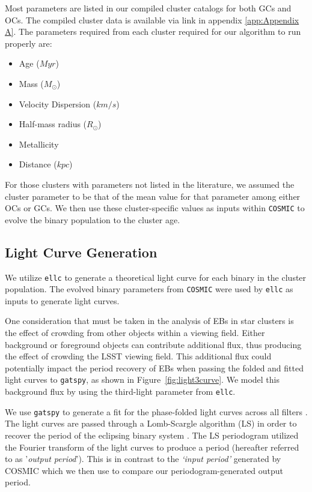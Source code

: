 \documentclass[twocolumn]{aastex63}
\begin{document}
 Most parameters are listed in our compiled cluster catalogs for both GCs and OCs. The compiled cluster data is available via link in appendix \ref{app:Appendix A}. The parameters required from each cluster required for our algorithm to run properly are:
 
\begin{itemize}
    \item Age ($Myr$)
    \item Mass ($M_{\odot}$)
    \item Velocity Dispersion ($km/s$)
    \item Half-mass radius ($R_{\odot}$)
    \item Metallicity
    \item Distance ($kpc$)
\end{itemize}
 For those clusters with parameters  not listed in the literature, we assumed the cluster parameter to be that of the mean value for that parameter among either OCs or GCs. We then use these cluster-specific values as inputs within \texttt{COSMIC} to evolve the binary population to the cluster age.
 
\subsection{Light Curve Generation}
\label{subsec:ellc}
 We utilize \texttt{ellc} \citep{2016ascl.soft03016M} to generate a theoretical light curve for each binary in the cluster population. The evolved binary parameters from \texttt{COSMIC} were used by \texttt{ellc} as inputs to generate light curves.
 
One consideration that must be taken in the analysis of EBs in star clusters is the effect of crowding from other objects within a viewing field. Either background or foreground objects can contribute additional flux, thus producing the effect of crowding the LSST viewing field. This additional flux could potentially impact the period recovery of EBs when passing the folded and fitted light curves to \texttt{gatspy}, as shown in Figure~\ref{fig:light3curve}. We model this background flux by using the third-light parameter from \texttt{ellc}.
 
 We use \texttt{gatspy} to generate a fit for the phase-folded light curves across all filters \citep{2016ascl.soft10007V}. The light curves are passed through a Lomb-Scargle algorithm (LS) in order to recover the period of the eclipsing binary system \citep{2015ApJ...812...18V}. The LS periodogram utilized the Fourier transform of the light curves to produce a period (hereafter referred to as '\textit{output period}'). This is in contrast to the \textit{‘input period’} generated by COSMIC which we then use to compare our periodogram-generated output period. 
\end{document}
